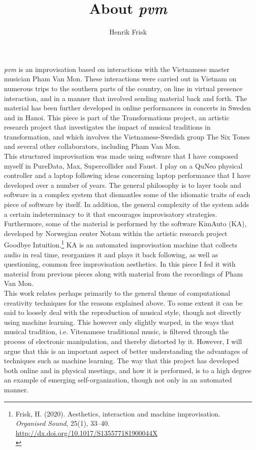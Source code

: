 \documentclass[11pt]{article}
\author{Henrik Frisk}
\date{ }
\title{About \emph{pvm}}
\begin{document}
\maketitle
\noindent
\emph{pvm} is an improvisation based on interactions with the Vietnamese master musician Pham Van Mon. These interactions were carried out in Vietnam on numerous trips to the southern parts of the country, on line in virtual presence interaction, and in a manner that involved sending material back and forth. The material has been further developed in online performances in concerts in Sweden and in Hanoi. This piece is part of the Transformations project, an artistic research project that investigates the impact of musical traditions in transformation, and which involves the Vietnamese-Swedish group The Six Tones and several other collaborators, including Pham Van Mon.\\

This structured improvisation was made using software that I have composed myself in PureData, Max, Supercollider and Faust. I play on a QuNeo physical controller and a laptop following ideas concerning laptop performance that I have developed over a number of years. The general philosophy is to layer tools and software in a complex system that dismantles some of the idiomatic traits of each piece of software by itself. In addition, the general complexity of the system adds a certain indeterminacy to it that encourages improvisatory strategies. Furthermore, some of the material is performed by the software KimAuto (KA), developed by Norwegian center Notam within the artistic research project Goodbye Intuition.\footnote{Frisk, H. (2020). Aesthetics, interaction and machine improvisation. \emph{Organised Sound}, 25(1), 33–40. \url{http://dx.doi.org/10.1017/S135577181900044X}\\} KA is an automated improvisation machine that collects audio in real time, reorganizes it and plays it back following, as well as questioning, common free improvisation aesthetics. In this piece I fed it with material from previous pieces along with material from the recordings of Pham Van Mon.\\

This work relates perhaps primarily to the general theme of computational creativity techniques for the reasons explained above. To some extent it can be said to loosely deal with the reproduction of musical style, though not directly using machine learning. This however only slightly warped, in the ways that musical tradition, i.e. Vitenamese traditional music, is filtered through the process of electronic manipulation, and thereby distorted by it. However, I will argue that this is an important aspect of better understanding the advantages of techniques such as machine learning. The way that this project has developed both online and in physical meetings, and how it is performed, is to a high degree an example of emerging self-organization, though not only in an automated manner.\\
\end{document}
